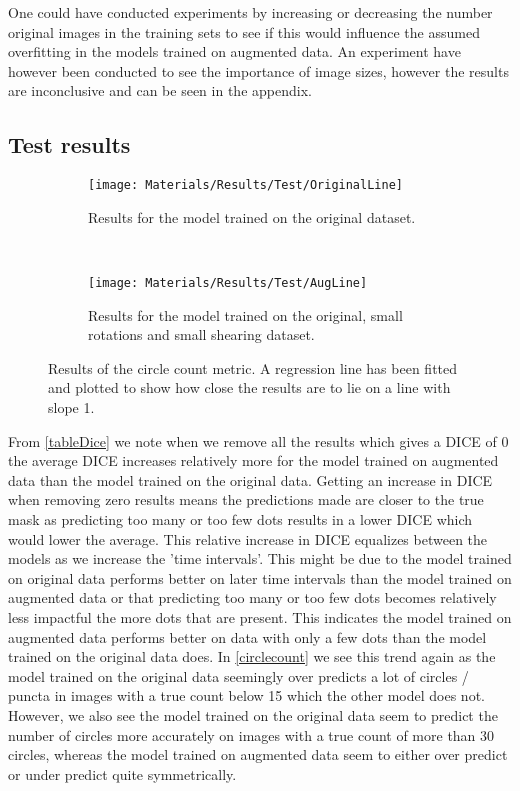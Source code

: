 One could have conducted experiments by increasing or decreasing the number original images in the training sets to see if this would influence the assumed overfitting in the models trained on augmented data. An experiment have however been conducted to see the importance of image sizes, however the results are inconclusive and can be seen in the appendix.

\subsection{Test results}

\begin{wrapfigure}[25]{l}{0.3\linewidth}
	\vspace{-1.5cm}
	\centering
	\vspace{1cm}
	\begin{subfigure}[b]{\linewidth}
		\centering
		\texttt{[image: Materials/Results/Test/OriginalLine]}
		\caption{Results for the model trained on the original dataset.\newline}
	\end{subfigure}
	\\
	\begin{subfigure}[b]{\linewidth}
		\centering
		\texttt{[image: Materials/Results/Test/AugLine]}
		\caption{Results for the model trained on the original, small rotations and small shearing dataset.}
	\end{subfigure}
	\caption{Results of the circle count metric. A regression line has been fitted and plotted to show how close the results are to lie on a line with slope 1.}
	\label{circlecount}
\end{wrapfigure}

From \autoref{tableDice} we note when we remove all the results which gives a DICE of 0 the average DICE increases relatively more for the model trained on augmented data than the model trained on the original data. Getting an increase in DICE when removing zero results means the predictions made are closer to the true mask as predicting too many or too few dots results in a lower DICE which would lower the average. This relative increase in DICE equalizes between the models as we increase the 'time intervals'. This might be due to the model trained on original data performs better on later time intervals than the model trained on augmented data or that predicting too many or too few dots becomes relatively less impactful the more dots that are present. This indicates the model trained on augmented data performs better on data with only a few dots than the model trained on the original data does. In \autoref{circlecount} we see this trend again as the model trained on the original data seemingly over predicts a lot of circles / puncta in images with a true count below 15 which the other model does not. However, we also see the model trained on the original data seem to predict the number of circles more accurately on images with a true count of more than 30 circles, whereas the model trained on augmented data seem to either over predict or under predict quite symmetrically.

